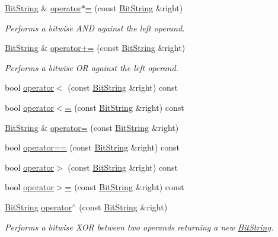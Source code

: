 \begin{DoxyCompactItemize}
\hyperlink{class_k_k_b_1_1_bit_string}{Bit\+String} \& \hyperlink{class_k_k_b_1_1_bit_string_a816e8582a6207f71528ef27f95485ace}{operator$\ast$=} (const \hyperlink{class_k_k_b_1_1_bit_string}{Bit\+String} \&right)
\begin{DoxyCompactList}\small\item\em Performs a bitwise A\+ND against the left operand. \end{DoxyCompactList}\item 
\hyperlink{class_k_k_b_1_1_bit_string}{Bit\+String} \& \hyperlink{class_k_k_b_1_1_bit_string_a8c697a5e1cfd70f326419c0b11d402f3}{operator+=} (const \hyperlink{class_k_k_b_1_1_bit_string}{Bit\+String} \&right)
\begin{DoxyCompactList}\small\item\em Performs a bitwise OR against the left operand. \end{DoxyCompactList}\item 
bool \hyperlink{class_k_k_b_1_1_bit_string_a92d6491b82ffcc6e48380bcf9a96b855}{operator$<$} (const \hyperlink{class_k_k_b_1_1_bit_string}{Bit\+String} \&right) const 
\item 
bool \hyperlink{class_k_k_b_1_1_bit_string_a69dca05db1f9aaec971b2b43f9a0fb59}{operator$<$=} (const \hyperlink{class_k_k_b_1_1_bit_string}{Bit\+String} \&right) const 
\item 
\hyperlink{class_k_k_b_1_1_bit_string}{Bit\+String} \& \hyperlink{class_k_k_b_1_1_bit_string_a07268ed7a0fac77e1acfc3b34eb828c5}{operator=} (const \hyperlink{class_k_k_b_1_1_bit_string}{Bit\+String} \&right)
\item 
bool \hyperlink{class_k_k_b_1_1_bit_string_ac436c72481bec0f73ef3d7e565c5f2dd}{operator==} (const \hyperlink{class_k_k_b_1_1_bit_string}{Bit\+String} \&right) const 
\item 
bool \hyperlink{class_k_k_b_1_1_bit_string_af901028ada8c1bd2e22562157158e6c1}{operator$>$} (const \hyperlink{class_k_k_b_1_1_bit_string}{Bit\+String} \&right) const 
\item 
bool \hyperlink{class_k_k_b_1_1_bit_string_a22da340205227de5bb327cb64ee5082c}{operator$>$=} (const \hyperlink{class_k_k_b_1_1_bit_string}{Bit\+String} \&right) const 
\item 
\hyperlink{class_k_k_b_1_1_bit_string}{Bit\+String} \hyperlink{class_k_k_b_1_1_bit_string_a5f9d741f91e71f59bfd148773af5050f}{operator$^\wedge$} (const \hyperlink{class_k_k_b_1_1_bit_string}{Bit\+String} \&right)
\begin{DoxyCompactList}\small\item\em Performs a bitwise X\+OR between two operands returning a new \hyperlink{class_k_k_b_1_1_bit_string}{Bit\+String}. \end{DoxyCompactList}\item 

\end{DoxyCompactItemize}
